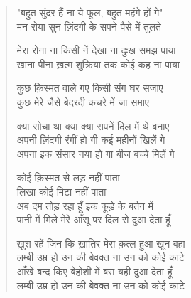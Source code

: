 \documentclass{book}
\begin{document}
\begin{verse}
{{"बहुत सुंदर हैं ना ये फूल, बहुत महंगे हों गे" \\
मन रोया सुन ज़िंदगी के सपने पैसे में तुलते

मेरा रोना ना किसी नें देखा ना दुःख समझ पाया \\
खाना पीना ख़त्म शुक्रिया तक कोई कह ना पाया

कुछ क़िस्मत वाले गए किसी संग घर सजाए \\
कुछ मेरे जैसे बेदरदी कचरे में जा समाए

क्या सोचा था क्या क्या सपनें दिल में थे बनाए \\
अपनी ज़िंदगी रंगीं हो गी कई महीनों खिलें गे \\
अपना इक संसार नया हो गा बीज बच्चे मिलें गे

कोई क़िस्मत से लड़ नहीं पाता \\
लिखा कोई मिटा नहीं पाता \\
अब दम तोड़ रहा हूँ इक कूड़े के बर्तन में \\
पानी में मिले मेरे आँसू पर दिल से दुआ देता हूँ

ख़ुश रहें जिन कि ख़ातिर मेरा क़त्ल हुआ ख़ून बहा \\
लम्बी उम्र हो उन की बेवक्त ना उन को कोई काटे \\
आँखें बन्द किए बेहोशी में बस यही दुआ देता हूँ \\
लम्बी उम्र हो उन की बेवक्त ना उन को कोई काटे
}
}\end{verse}
\end{document}
